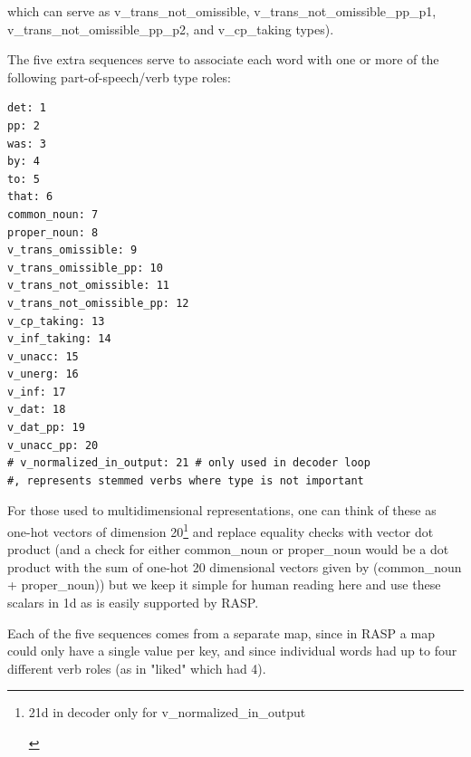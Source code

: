 \documentclass[11pt]{article}
\begin{document}
which can serve as v\_trans\_not\_omissible, v\_trans\_not\_omissible\_pp\_p1, v\_trans\_not\_omissible\_pp\_p2, and v\_cp\_taking types). 

The five extra sequences serve to associate each word with one or more of the following part-of-speech/verb type roles:
\begin{tiny}
\begin{verbatim}
det: 1
pp: 2
was: 3
by: 4
to: 5
that: 6
common_noun: 7
proper_noun: 8
v_trans_omissible: 9
v_trans_omissible_pp: 10
v_trans_not_omissible: 11
v_trans_not_omissible_pp: 12
v_cp_taking: 13
v_inf_taking: 14
v_unacc: 15
v_unerg: 16
v_inf: 17
v_dat: 18
v_dat_pp: 19
v_unacc_pp: 20
# v_normalized_in_output: 21 # only used in decoder loop 
#, represents stemmed verbs where type is not important
\end{verbatim}
\end{tiny}

For those used to multidimensional representations, one can think of these as one-hot vectors of dimension 20\footnote{\begin{footnotesize}21d in decoder only for v\_normalized\_in\_output\end{footnotesize}} and replace equality checks with vector dot product (and a check for either common\_noun or proper\_noun would be a dot product with the sum of one-hot 20 dimensional vectors given by (common\_noun + proper\_noun)) but we keep it simple for human reading here and use these scalars in 1d as is easily supported by RASP.

Each of the five sequences comes from a separate map, since in RASP a map could only have a single value per key, and since individual words had up to four different verb roles (as in "liked" which had 4).
\end{document}
